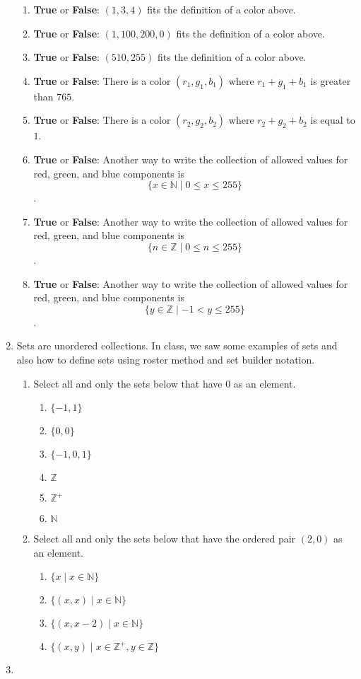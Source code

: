 \documentclass[12pt, oneside]{article}
\begin{document}
\begin{enumerate}
{\begin{enumerate}
\item \textbf{True} or \textbf{False}: $(1, 3, 4)$ fits the definition of a color above.
\item \textbf{True} or \textbf{False}: $(1, 100, 200, 0)$ fits the definition of a color above.
\item \textbf{True} or \textbf{False}: $(510, 255)$ fits the definition of a color above.
\item \textbf{True} or \textbf{False}: There is a color $(r_1, g_1, b_1)$ where $r_1 + g_1 + b_1$ is greater than $765$.
\item \textbf{True} or \textbf{False}: There is a color $(r_2, g_2, b_2)$ where $r_2 + g_2 + b_2$ is equal to $1$.
\item \textbf{True} or \textbf{False}: Another way to write the collection of allowed values for red, green, and blue components is $$\{x \in \mathbb{N}\mid 0 \leq x \leq 255 \}$$.
\item \textbf{True} or \textbf{False}: Another way to write the collection of allowed values for red, green, and blue components is $$\{n \in \mathbb{Z}\mid 0 \leq n \leq 255 \}$$.
\item \textbf{True} or \textbf{False}: Another way to write the collection of allowed values for red, green, and blue components is $$\{y \in \mathbb{Z}\mid -1 < y \leq 255 \}$$.
\end{enumerate}
\vfill }
    \item {

Sets are unordered collections. In class, we saw some examples of sets
and also how to define sets using roster method and set builder 
notation.
\begin{enumerate}
    \item Select all and only the sets below that have $0$ as an element.
        \begin{enumerate}
            \item $\{-1,1\}$
            \item $\{0,0\}$
            \item $\{-1,0,1\}$
            \item $\mathbb{Z}$
            \item $\mathbb{Z}^+$
            \item $\mathbb{N}$
        \end{enumerate}
    \item Select all and only the sets below that have the ordered pair $(2, 0)$ as an element.
        \begin{enumerate}
            \item $\{ x \mid x \in \mathbb{N} \}$
            \item $\{ (x,x) \mid x \in \mathbb{N} \}$
            \item $\{ (x, x-2) \mid x \in \mathbb{N} \}$
            \item $\{ (x,y) \mid x \in \mathbb{Z}^+, y \in \mathbb{Z} \}$
        \end{enumerate}
\end{enumerate} }
    \item {

}
\end{enumerate}
\end{document}
